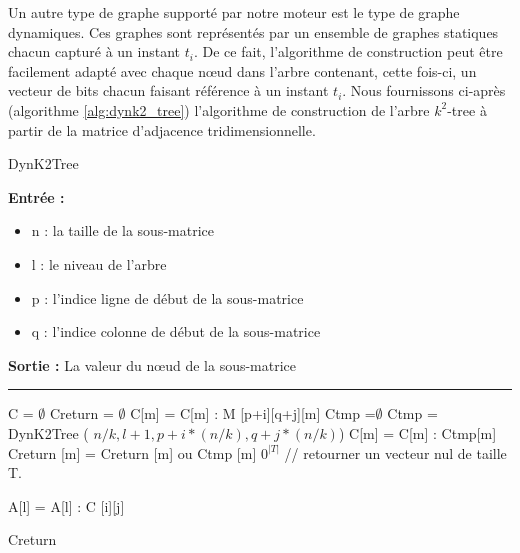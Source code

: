 \documentclass[a4paper,oneside,12pt]{report}
\theoremstyle{definition}
\begin{document}
	Un autre type de graphe supporté par notre moteur est le type de graphe dynamiques. Ces graphes sont représentés par un ensemble de graphes statiques chacun capturé à un instant $t_i$. De ce fait, l'algorithme de construction peut être facilement adapté avec chaque nœud dans l'arbre contenant, cette fois-ci, un vecteur de bits chacun faisant référence à un instant $t_i$. Nous fournissons ci-après (algorithme \ref{alg:dynk2_tree}) l'algorithme de construction de l'arbre $k^2$-tree à partir de la matrice d'adjacence tridimensionnelle.\\
	


	
					\begin{algorithm}[H]
					\label{alg:dynk2_tree}
					\caption{DynK2Tree}
					\textbf{Entrée :}
						\begin{itemize}[label=$\bullet$]
							\item n : la taille de la sous-matrice
							\item l : le niveau de l'arbre
							\item p : l'indice ligne de début de la sous-matrice
							\item q : l'indice colonne de début de la sous-matrice
						\end{itemize}
					\textbf{Sortie :} La valeur du nœud de la sous-matrice\\							\noindent\rule{\textwidth}{1pt}
						
						
				\begin{algorithmic} [1]
					\STATE C = $ \emptyset$
					\STATE Creturn  = $ \emptyset$
									\STATE C[m] = C[m] : M [p+i][q+j][m]
								\ENDFOR
							\ELSE
								\STATE Ctmp =$\emptyset$
								\STATE  Ctmp = DynK2Tree ( $n/k,l+1,p+i*(n/k), q+j*(n/k)$)
									\STATE C[m] = C[m] : Ctmp[m]
									\STATE Creturn [m] = Creturn [m] ou Ctmp [m]
								\ENDFOR
							\ENDIF
						\ENDFOR
					\ENDFOR
						\RETURN $0^{|T|}$ // retourner un vecteur nul de taille T.
					\ENDIF
					
					
					
								\STATE A[l] = A[l] : C [i][j]
							\ENDIF
						\ENDFOR
					\ENDFOR
	
					 \RETURN Creturn
					
				\end{algorithmic}
			\end{algorithm}
			
\end{document}
